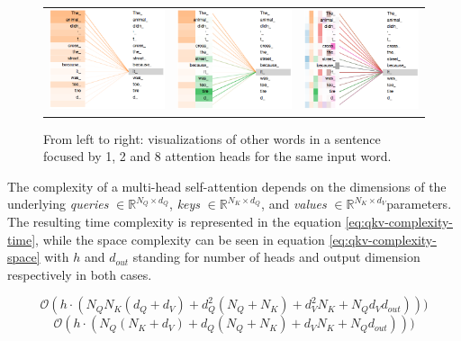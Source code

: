 \begin{figure}[!hpt]
  \centering
  \begin{tabular}{ccc}
      {\includegraphics[width=0.32\columnwidth]{background/attention_1_head.png}} &
      {\includegraphics[width=0.32\columnwidth]{background/attention_2_head.png}} & 
      {\includegraphics[width=0.32\columnwidth]{background/attention_8_head.png}}
  \end{tabular}
  \caption{From left to right: visualizations of other words in a sentence focused by 1, 2 and 8 attention heads for the same input word.}
  \label{fig:1-2-8-heads}
\end{figure}

The complexity of a multi-head self-attention depends on the dimensions of the underlying \textit{queries} \(\in \mathbb{R}^{N_Q \times d_Q}\), \textit{keys} \(\in \mathbb{R}^{N_K \times d_Q}\), and \textit{values} \(\in \mathbb{R}^{N_K \times d_V}\)parameters. The resulting time complexity is represented in the equation \ref{eq:qkv-complexity-time}, while the space complexity can be seen in equation \ref{eq:qkv-complexity-space} with \(h\) and \(d_{out}\) standing for number of heads and output dimension respectively in both cases.

\begin{equation}\label{eq:qkv-complexity-time}
  \mathcal{O}(h \cdot (N_Q N_K (d_Q + d_V) + d_Q^2 (N_Q + N_K) + d_V^2 N_K + N_Q d_V d_{out}) ))
\end{equation}
\begin{equation}\label{eq:qkv-complexity-space}
  \mathcal{O}(h \cdot (N_Q (N_K + d_V) + d_Q (N_Q + N_K) + d_V N_K + N_Q d_{out}) ))
\end{equation}

